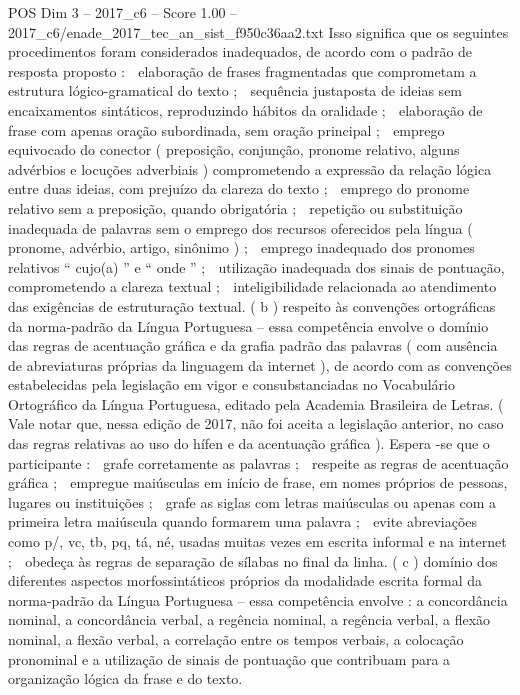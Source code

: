 \begin{textsample}{POS Dim 3 – 2017\_c6 – Score 1.00 – 2017\_c6/enade\_2017\_tec\_an\_sist\_f950c36aa2.txt}
Isso significa que os seguintes procedimentos foram considerados inadequados, de acordo com o padrão de resposta proposto :  elaboração de frases fragmentadas que comprometam a estrutura lógico-gramatical do texto ;  sequência justaposta de ideias sem encaixamentos sintáticos, reproduzindo hábitos da oralidade ;  elaboração de frase com apenas oração subordinada, sem oração principal ;  emprego equivocado do conector ( preposição, conjunção, pronome relativo, alguns advérbios e locuções adverbiais ) comprometendo a expressão da relação lógica entre duas ideias, com prejuízo da clareza do texto ;  emprego do pronome relativo sem a preposição, quando obrigatória ;  repetição ou substituição inadequada de palavras sem o emprego dos recursos oferecidos pela língua ( pronome, advérbio, artigo, sinônimo ) ;  emprego inadequado dos pronomes relativos “ cujo(a) ” e “ onde ” ;  utilização inadequada dos sinais de pontuação, comprometendo a clareza textual ;  inteligibilidade relacionada ao atendimento das exigências de estruturação textual. ( b ) respeito às convenções ortográficas da norma-padrão da Língua Portuguesa – essa competência envolve o domínio das regras de acentuação gráfica e da grafia padrão das palavras ( com ausência de abreviaturas próprias da linguagem da internet ), de acordo com as convenções estabelecidas pela legislação em vigor e consubstanciadas no Vocabulário Ortográfico da Língua Portuguesa, editado pela Academia Brasileira de Letras. ( Vale notar que, nessa edição de 2017, não foi aceita a legislação anterior, no caso das regras relativas ao uso do hífen e da acentuação gráfica ).
Espera -se que o participante :  grafe corretamente as palavras ;  respeite as regras de acentuação gráfica ;  empregue maiúsculas em início de frase, em nomes próprios de pessoas, lugares ou instituições ;  grafe as siglas com letras maiúsculas ou apenas com a primeira letra maiúscula quando formarem uma palavra ;  evite abreviações como p/, vc, tb, pq, tá, né, usadas muitas vezes em escrita informal e na internet ;  obedeça às regras de separação de sílabas no final da linha. ( c ) domínio dos diferentes aspectos morfossintáticos próprios da modalidade escrita formal da norma-padrão da Língua Portuguesa – essa competência envolve : a concordância nominal, a concordância verbal, a regência nominal, a regência verbal, a flexão nominal, a flexão verbal, a correlação entre os tempos verbais, a colocação pronominal e a utilização de sinais de pontuação que contribuam para a organização lógica da frase e do texto.

\end{textsample}
